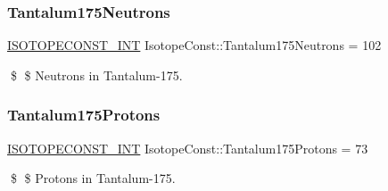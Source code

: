 \subsubsection{\texorpdfstring{Tantalum175\+Neutrons}{Tantalum175Neutrons}}
{\footnotesize\ttfamily \mbox{\hyperlink{group___isotope_const-_macros_ga5f18360b3e99483a35c32d789e62621c}{I\+S\+O\+T\+O\+P\+E\+C\+O\+N\+S\+T\+\_\+\+I\+NT}} Isotope\+Const\+::\+Tantalum175\+Neutrons = 102}

\$ \$ Neutrons in Tantalum-\/175. \mbox{\label{group___isotope_const-_tantalum-_ta175_gaaf6d5ee92cd282df447926637b1c0279}} 
\subsubsection{\texorpdfstring{Tantalum175\+Protons}{Tantalum175Protons}}
{\footnotesize\ttfamily \mbox{\hyperlink{group___isotope_const-_macros_ga5f18360b3e99483a35c32d789e62621c}{I\+S\+O\+T\+O\+P\+E\+C\+O\+N\+S\+T\+\_\+\+I\+NT}} Isotope\+Const\+::\+Tantalum175\+Protons = 73}

\$ \$ Protons in Tantalum-\/175. 